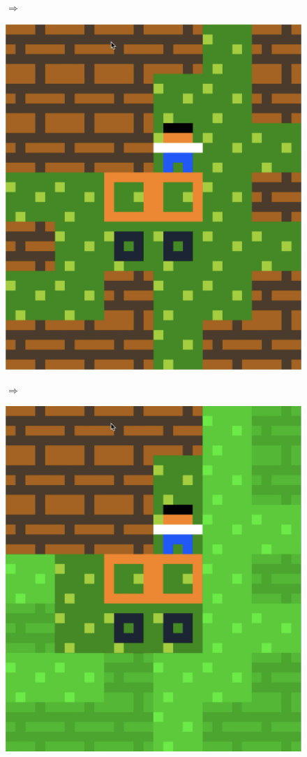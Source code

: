 \begin{figure}[!htbp]
\begin{minipage}[t]{0.2\textwidth}
\end{minipage}
$\Longrightarrow$
\begin{minipage}[t]{0.2\textwidth}
\includegraphics[width=\textwidth]{figures/maxii5.png} \hfill \\
\end{minipage}
$\Longrightarrow$
\begin{minipage}[t]{0.2\textwidth}
\includegraphics[width=\textwidth]{figures/maxii6.png} \hfill \\

\end{minipage}
\end{figure}
